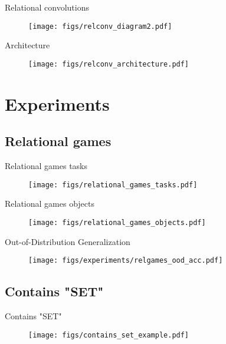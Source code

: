 \documentclass{beamer}
\begin{document}
\begin{frame}{Relational convolutions}
  \begin{figure}
    \centering
    \texttt{[image: figs/relconv\_diagram2.pdf]}
  \end{figure}
\end{frame}

\begin{frame}{Architecture}
  \begin{figure}
    \centering
    \texttt{[image: figs/relconv\_architecture.pdf]}
  \end{figure}
\end{frame}

\section{Experiments}
\subsection{Relational games}
\begin{frame}{Relational games tasks}
  \begin{figure}
    \centering
    \texttt{[image: figs/relational\_games\_tasks.pdf]}
  \end{figure}
\end{frame}
\begin{frame}{Relational games objects}
  \begin{figure}
    \centering
    \texttt{[image: figs/relational\_games\_objects.pdf]}
  \end{figure}
\end{frame}

\begin{frame}{Out-of-Distribution Generalization}
  \begin{figure}
    \texttt{[image: figs/experiments/relgames\_ood\_acc.pdf]}
  \end{figure}
\end{frame}

\subsection{Contains "SET"}
\begin{frame}{Contains "SET"}
  \begin{figure}
    \centering
    \texttt{[image: figs/contains\_set\_example.pdf]}
  \end{figure}
\end{frame}
\end{document}
